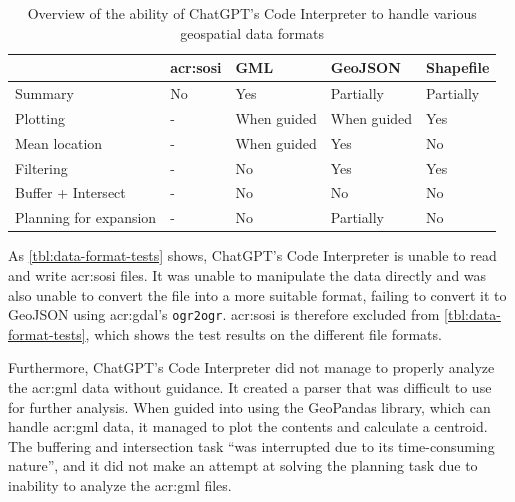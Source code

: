 \begin{table}
    \centering
    \begin{tabular}{l|p{}p{}p{}p{}}
        \toprule
                               & \textbf{\acrshort{acr:sosi}} & \textbf{GML} & \textbf{GeoJSON} & \textbf{Shapefile} \\
        \midrule
        Summary                & No                           & Yes          & Partially        & Partially          \\
        Plotting               & -                            & When guided  & When guided      & Yes                \\
        Mean location          & -                            & When guided  & Yes              & No                 \\
        Filtering              & -                            & No           & Yes              & Yes                \\
        Buffer + Intersect     & -                            & No           & No               & No                 \\
        Planning for expansion & -                            & No           & Partially        & No                 \\
        \bottomrule
    \end{tabular}
    \caption{Overview of the ability of ChatGPT's Code Interpreter to handle various geospatial data formats}
    \label{tbl:data-format-tests}
\end{table}

As \autoref{tbl:data-format-tests} shows, ChatGPT's Code Interpreter is unable to read and write \acrshort{acr:sosi} files. It was unable to manipulate the data directly and was also unable to convert the file into a more suitable format, failing to convert it to GeoJSON using \acrshort{acr:gdal}'s \texttt{ogr2ogr}. \acrshort{acr:sosi} is therefore excluded from \autoref{tbl:data-format-tests}, which shows the test results on the different file formats.

Furthermore, ChatGPT's Code Interpreter did not manage to properly analyze the \acrshort{acr:gml} data without guidance. It created a parser that was difficult to use for further analysis. When guided into using the GeoPandas library, which can handle \acrshort{acr:gml} data, it managed to plot the contents and calculate a centroid. The buffering and intersection task \enquote{was interrupted due to its time-consuming nature}, and it did not make an attempt at solving the planning task due to inability to analyze the \acrshort{acr:gml} files.

